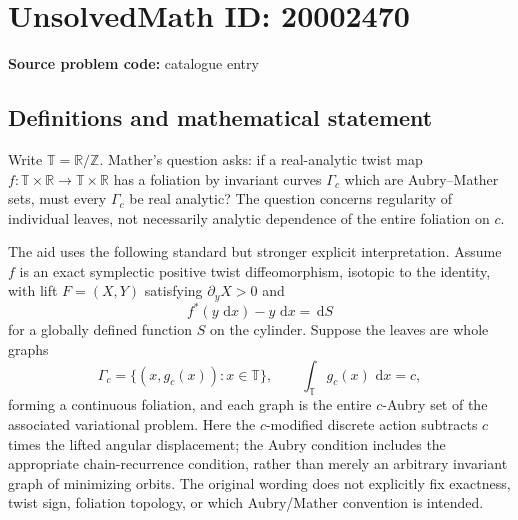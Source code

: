 \documentclass[11pt]{article}
\newcommand{\Z}{\mathbb{Z}}
\newcommand{\R}{\mathbb{R}}
\newcommand{\dd}{\,\mathrm{d}}
\begin{document}
\section*{UnsolvedMath ID: 20002470}
\textbf{Source problem code:} catalogue entry
\subsection{Definitions and mathematical statement}
Write $\mathbb T=\R/\Z$. Mather's question asks: if a real-analytic twist map $f:\mathbb T\times\R\to\mathbb T\times\R$ has a foliation by invariant curves $\Gamma_c$ which are Aubry--Mather sets, must every $\Gamma_c$ be real analytic? The question concerns regularity of individual leaves, not necessarily analytic dependence of the entire foliation on $c$.

The aid uses the following standard but stronger explicit interpretation. Assume $f$ is an exact symplectic positive twist diffeomorphism, isotopic to the identity, with lift $F=(X,Y)$ satisfying $\partial_yX>0$ and
\[
 f^*(y\,\dd x)-y\,\dd x=\dd S
\]
for a globally defined function $S$ on the cylinder. Suppose the leaves are whole graphs
\[
 \Gamma_c=\{(x,g_c(x)):x\in\mathbb T\},\qquad
 \int_{\mathbb T}g_c(x)\,\dd x=c,
\]
forming a continuous foliation, and each graph is the entire $c$-Aubry set of the associated variational problem. Here the $c$-modified discrete action subtracts $c$ times the lifted angular displacement; the Aubry condition includes the appropriate chain-recurrence condition, rather than merely an arbitrary invariant graph of minimizing orbits. The original wording does not explicitly fix exactness, twist sign, foliation topology, or which Aubry/Mather convention is intended.
\end{document}

